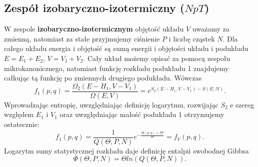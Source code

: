 \documentclass[12pt,a4paper,openright]{report} %
\begin{document}
\subsection{Zespół izobaryczno-izotermiczny ($N p T$)}
W zespole \textbf{izobaryczno-izotermicznym} objętość układu $V$ uważamy za zmienną, natomiast za stałe przyjmujemy ciśnienie $P$ i liczbę cząstek $N$. Dla całego układu energia i objętość są sumą energii i objętości układu i podukładu $E=E_1 + E_2$, $V=V_1 + V_2$. Cały układ możemy opisać za pomocą zespołu mikrokanonicznego, natomiast funkcję rozkładu podukładu 1 znajdujemy całkując tą funkcję po zmiennych drugiego podukładu. Wówczas
\begin{equation}
f_1 (p,q) = \frac{\Omega_2(E-H_1, V-V_1)}{\Omega(E,V)}=e^{S_2(E-H_1,V-V_1)-S(E,N)}.
\end{equation}
Wprowadzając entropię, uwzględniając definicję logarytmu, rozwijając $S_2$ e szereg względem $E_1$ i $V_1$ oraz uwzględniając małość podukładu $1$ otrzymujemy ostatecznie:
\begin{equation}
f_1(p,q)=\frac{1}{Q(\Theta,P,N)}e^{-\frac{H(p,q)+PV}{\Theta}}=f_V(p,q).
\end{equation}
Logarytm sumy statystycznej rozkładu daje definicję entalpii swobodnej Gibbsa
\begin{equation}
\Phi(\Theta,P,N)=\Theta ln(Q(\Theta,P,N)).
\end{equation}
%
%
\end{document}
